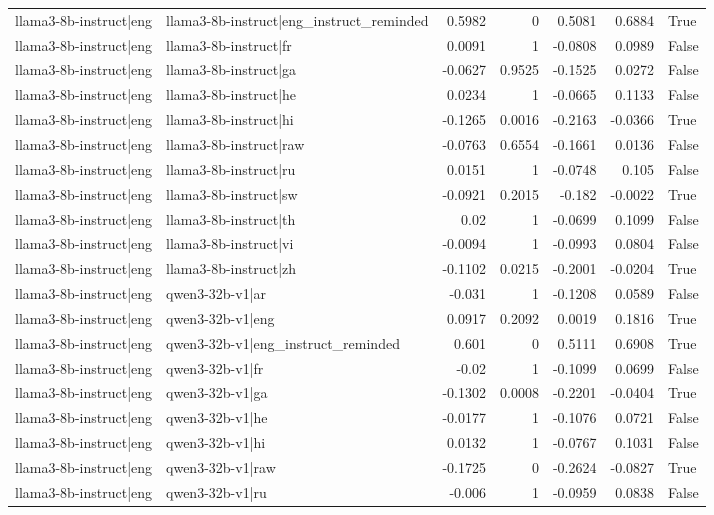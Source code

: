 \begin{table}
\begin{tabular}{l l r r r r l}
llama3-8b-instruct|eng & llama3-8b-instruct|eng_instruct_reminded & 0.5982 & 0 & 0.5081 & 0.6884 & True \\
llama3-8b-instruct|eng & llama3-8b-instruct|fr & 0.0091 & 1 & -0.0808 & 0.0989 & False \\
llama3-8b-instruct|eng & llama3-8b-instruct|ga & -0.0627 & 0.9525 & -0.1525 & 0.0272 & False \\
llama3-8b-instruct|eng & llama3-8b-instruct|he & 0.0234 & 1 & -0.0665 & 0.1133 & False \\
llama3-8b-instruct|eng & llama3-8b-instruct|hi & -0.1265 & 0.0016 & -0.2163 & -0.0366 & True \\
llama3-8b-instruct|eng & llama3-8b-instruct|raw & -0.0763 & 0.6554 & -0.1661 & 0.0136 & False \\
llama3-8b-instruct|eng & llama3-8b-instruct|ru & 0.0151 & 1 & -0.0748 & 0.105 & False \\
llama3-8b-instruct|eng & llama3-8b-instruct|sw & -0.0921 & 0.2015 & -0.182 & -0.0022 & True \\
llama3-8b-instruct|eng & llama3-8b-instruct|th & 0.02 & 1 & -0.0699 & 0.1099 & False \\
llama3-8b-instruct|eng & llama3-8b-instruct|vi & -0.0094 & 1 & -0.0993 & 0.0804 & False \\
llama3-8b-instruct|eng & llama3-8b-instruct|zh & -0.1102 & 0.0215 & -0.2001 & -0.0204 & True \\
llama3-8b-instruct|eng & qwen3-32b-v1|ar & -0.031 & 1 & -0.1208 & 0.0589 & False \\
llama3-8b-instruct|eng & qwen3-32b-v1|eng & 0.0917 & 0.2092 & 0.0019 & 0.1816 & True \\
llama3-8b-instruct|eng & qwen3-32b-v1|eng_instruct_reminded & 0.601 & 0 & 0.5111 & 0.6908 & True \\
llama3-8b-instruct|eng & qwen3-32b-v1|fr & -0.02 & 1 & -0.1099 & 0.0699 & False \\
llama3-8b-instruct|eng & qwen3-32b-v1|ga & -0.1302 & 0.0008 & -0.2201 & -0.0404 & True \\
llama3-8b-instruct|eng & qwen3-32b-v1|he & -0.0177 & 1 & -0.1076 & 0.0721 & False \\
llama3-8b-instruct|eng & qwen3-32b-v1|hi & 0.0132 & 1 & -0.0767 & 0.1031 & False \\
llama3-8b-instruct|eng & qwen3-32b-v1|raw & -0.1725 & 0 & -0.2624 & -0.0827 & True \\
llama3-8b-instruct|eng & qwen3-32b-v1|ru & -0.006 & 1 & -0.0959 & 0.0838 & False \\

\end{tabular}
\end{table}
